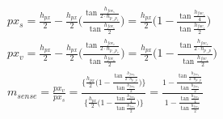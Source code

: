 \begin{align}
  px_s = \frac{h_{px}}{2} - \frac{h_{px}}{2}\Bigg(\frac{\tan\frac{h_{fov_s}}{2\cdot n_{p_{\to}p_s}}}{\tan{\frac{h_{fov_s}}{2}}}\Bigg) = \frac{h_{px}}{2}\Biggl(1-\frac{\tan{\frac{h_{fov_s}}{4}}}{\tan{\frac{h_{fov_s}}{2}}}\Biggr) \label{taikan:eq:kika1}\\
  px_v = \frac{h_{px}}{2} - \frac{h_{px}}{2}\Bigg(\frac{\tan\frac{h_{fov_v}}{2\cdot n_{p_{\to}p_v}}}{\tan{\frac{h_{fov_v}}{2}}}\Bigg) = \frac{h_{px}}{2}\Biggl(1-\frac{\tan{\frac{h_{fov_v}}{2\cdot n_{p_{\to}p}}}}{\tan{\frac{h_{fov_v}}{2}}}\Biggr) \label{taikan:eq:kika2}\\
  m_{sense} = \frac{px_v}{px_s} = \frac{\Biggl\{\frac{h_{px}}{2}\Bigg(1-\frac{\tan\frac{h_{fov_v}}{2\cdot n_{p_{\to}p}}}{\tan\frac{h_{fov_v}}{2}}\Bigg)\Biggr\}}{\Biggl\{\frac{h_{px}}{2}\Bigg(1-\frac{\tan\frac{h_{fov_s}}{4}}{\tan\frac{h_{fov_s}}{2}}\Bigg)\Biggr\}} = \frac{1-\frac{\tan\frac{h_{fov_v}}{2\cdot n_{p_{\to}p}}}{\tan\frac{h_{fov_s}}{2}}}{1-\frac{\tan\frac{h_{fov_s}}{4}}{\tan\frac{h_{fov_s}}{2}}} \label{taikan:eq:kika3}
\end{align}

